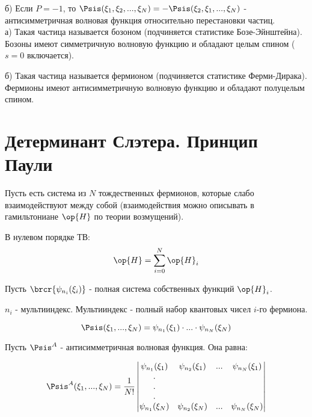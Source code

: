 б) Если $P = -1$, то  $\Psis(\xi_1, \xi_2, ..., \xi_N) = -\Psis(\xi_2, \xi_1, ..., \xi_N)$ - антисимметричная волновая функция относительно перестановки частиц.\\

а) Такая частица называется бозоном (подчиняется статистике Бозе-Эйнштейна). Бозоны имеют симметричную волновую функцию и обладают целым спином ($s = 0$ включается).

б) Такая частица называется фермионом (подчиняется статистике Ферми-Дирака). Фермионы имеют антисимметричную волновую функцию и обладают полуцелым спином.

\section{Детерминант Слэтера. Принцип Паули}

Пусть есть система из $N$ тождественных фермионов, которые слабо взаимодействуют между собой (взаимодействия можно описывать в гамильтониане $\op{H}$ по теории возмущений).

В нулевом порядке ТВ:
$$
\op{H} = \sum_{i=0}^N\op{H}_i
$$

Пусть $\brcr{\psi_{n_i}(\xi_i)}$ - полная система собственных функций $\op{H}_i$.

$n_i$ - мультииндекс. Мультииндекс - полный набор квантовых чисел $i$-го фермиона.

\begin{equation}
\label{eq:16_2_1}
\Psis(\xi_1, ..., \xi_N) = \psi_{n_1}(\xi_1) \cdot ... \cdot \psi_{n_N}(\xi_N)
\end{equation}

Пусть $\Psis^A$ - антисимметричная волновая функция. Она равна:

\begin{equation}
\label{eq:16_2_2}
\Psis^A(\xi_1, ..., \xi_N) = \frac{1}{N!} \left |
  \begin{matrix} 
  \psi_{n_1}(\xi_1) & \psi_{n_2}(\xi_1) & ... &  \psi_{n_N}(\xi_1) \\
  .                                &                                  &    &                                    \\
  .                                &                                  &    &                                    \\
  .                                &                                  &    &                                    \\
  \psi_{n_1}(\xi_N) & \psi_{n_2}(\xi_N) & ... &  \psi_{n_N}(\xi_N)
  \end{matrix} \right |
\end{equation}

